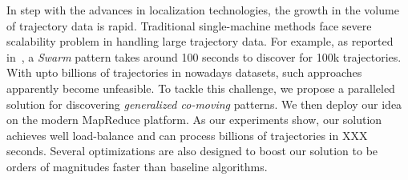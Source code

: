 In step with the advances in localization technologies, the growth in the volume of trajectory data is rapid. Traditional single-machine methods face severe scalability problem in handling large trajectory data. For example, as reported in~\cite{li2015platoon}, a \emph{Swarm} pattern takes around 100 seconds to discover for 100k trajectories. With upto billions of trajectories in nowadays datasets, such approaches apparently become unfeasible. To tackle this challenge, we propose a 
paralleled solution for discovering \emph{generalized co-moving} patterns. We then deploy our idea on the modern MapReduce platform. As our experiments show, our solution achieves well load-balance and can process billions of trajectories in XXX seconds. Several optimizations are also designed to boost our solution to be orders of magnitudes faster than baseline algorithms.
